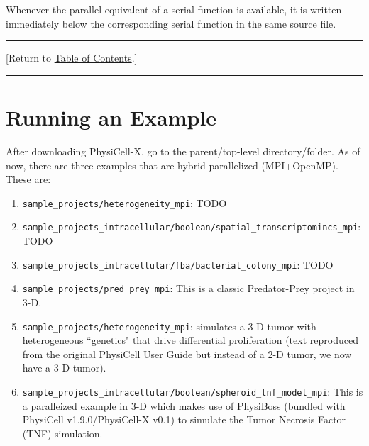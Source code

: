 \documentclass[12pt]{article}
\newcommand{\TOClink}{\begin{center}\hrule\vskip-5pt\phantom{.}\hfill[Return to \hyperlink{TOC}{Table of Contents}.]\hfill\phantom{.}\vskip3pt\hrule\end{center}}
\begin{document}
\begin{tcolorbox}[enhanced,attach boxed title to top center={yshift=-3mm,yshifttext=-1mm},
  colback=blue!5!white,colframe=blue!75!black,colbacktitle=red!80!black,
  title=Parallel Code,fonttitle=\bfseries,
  boxed title style={size=small,colframe=red!50!black} ]
  Whenever the parallel equivalent of a serial function is available, it is written immediately below the corresponding serial function in the same source file.
\end{tcolorbox}

\TOClink 

\section{Running an Example}
\label{sec:running_an_example}
After downloading PhysiCell-X, go to the parent/top-level directory/folder. As of now, there are three examples that are hybrid parallelized (MPI+OpenMP). These are:

\begin{enumerate}
    \item \texttt{sample\_projects/heterogeneity\_mpi}: TODO
    \item \texttt{sample\_projects\_intracellular/boolean/spatial\_transcriptomincs\_mpi}: TODO
    \item \texttt{sample\_projects\_intracellular/fba/bacterial\_colony\_mpi}: TODO
    \item \texttt{sample\_projects/pred\_prey\_mpi}: This is a classic Predator-Prey project in 3-D. 
    \item \texttt{sample\_projects/heterogeneity\_mpi}: simulates a 3-D tumor with heterogeneous ``genetics" that drive differential proliferation \cite{ref:PhysiCell} (text reproduced from the original PhysiCell User Guide but instead of a 2-D tumor, we now have a 3-D tumor).
    \item \texttt{sample\_projects\_intracellular/boolean/spheroid\_tnf\_model\_mpi}: This is a paralleized example in 3-D which makes use of PhysiBoss (bundled with PhysiCell v1.9.0/PhysiCell-X v0.1) to simulate the Tumor Necrosis Factor (TNF) simulation. 
\end{enumerate}
\end{document}

